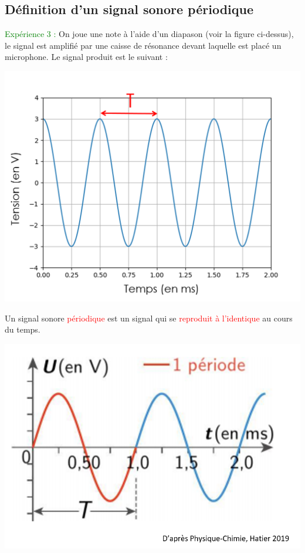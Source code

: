 \subsection{Définition d'un signal sonore périodique}
\textcolor{green}{Expérience 3 :} On joue une note à l'aide d'un diapason (voir la figure ci-dessus), le signal est amplifié par une caisse de résonance devant laquelle est placé un microphone. Le signal produit est le suivant :
\begin{multicols}{2}
\begin{center}
    \includegraphics[scale=0.4]{Images/Cours/Chapitre_3/Signal_diapason_freq.png}
\end{center}
\begin{tcolorbox}
[colback=green!5!white,colframe=green!75!black,title=\textbf{Signal périodique :}]
Un signal sonore \textcolor{red}{périodique} est un signal qui se \textcolor{red}{reproduit à l'identique} au cours du temps.
\begin{center}
    \includegraphics[scale=0.35]{Images/Cours/Chapitre_3/Periode.PNG}
\end{center}
\end{tcolorbox}
\end{multicols}

